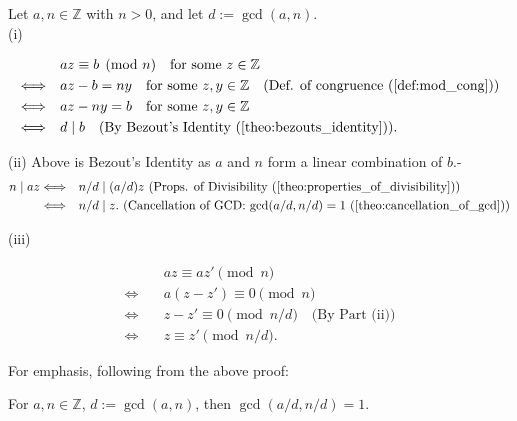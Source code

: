 \begin{Proof}
    Let \(a, n \in \mathbb{Z}\) with \(n > 0\), and let \(d := \gcd(a, n)\).\\

    (i)

    \vspace{-3em}
    \begin{align*}
        &az \equiv b \pmod{n} \quad \text{for some } z \in \mathbb{Z} \\
        \Longleftrightarrow \quad &az - b = ny \quad \text{for some } z, y \in \mathbb{Z} \quad \text{(Def. of congruence (\ref{def:mod_cong}))} \\
        \Longleftrightarrow \quad &az - ny = b \quad \text{for some } z, y \in \mathbb{Z} \\
        \Longleftrightarrow \quad &d \mid b \quad \text{(By Bezout's Identity (\ref{theo:bezouts_identity}))}.
        \end{align*}

    (ii) Above is Bezout's Identity as $a$ and $n$ form a linear combination of $b$.-
    \begin{align*}
        n \mid az \Longleftrightarrow \quad & n/d \mid (a/d)z  \text{ (Props. of Divisibility (\ref{theo:properties_of_divisibility}))}\\
        \Longleftrightarrow \quad & n/d \mid z.  \text{ (Cancellation of GCD: $\gcd(a/d,n/d)=1$ (\ref{theo:cancellation_of_gcd}))}
    \end{align*}


    (iii)

    \vspace{-3em}
    \begin{align*}
        &az \equiv az' \pmod{n} \\
        \Longleftrightarrow \quad & a(z - z') \equiv 0 \pmod{n} \\
        \Longleftrightarrow \quad & z - z' \equiv 0 \pmod{n/d} \quad \text{(By Part (ii))} \\
        \Longleftrightarrow \quad & z \equiv z' \pmod{n/d}.
        \end{align*}

\end{Proof}

\noindent
For emphasis, following from the above proof:
\begin{Def}
    
    For $a,n\in\mathbb{Z}$, $d:=\gcd(a,n)$, then $\gcd(a/d,n/d)=1$.
\end{Def}








